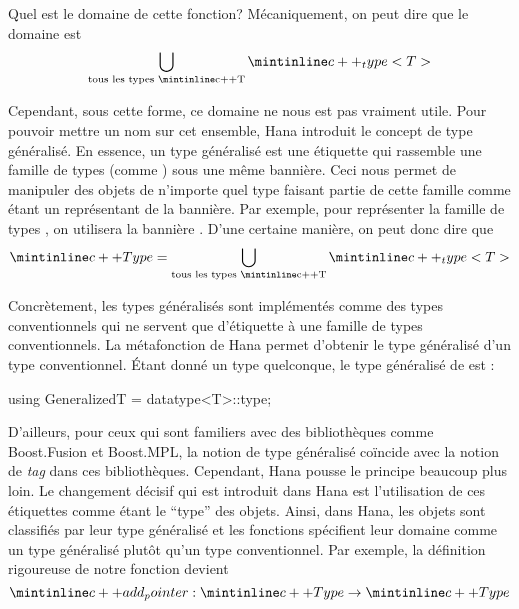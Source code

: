 Quel est le domaine de cette fonction? Mécaniquement, on peut dire que le
domaine est
\[
    \bigcup_{\text{tous les types \cc{T}}} \cc{_type<T>}
\]

Cependant, sous cette forme, ce domaine ne nous est pas vraiment utile. Pour
pouvoir mettre un nom sur cet ensemble, Hana introduit le concept de type
généralisé. En essence, un type généralisé est une étiquette qui rassemble
une famille de types (comme ) sous une même bannière. Ceci
nous permet de manipuler des objets de n'importe quel type faisant partie
de cette famille comme étant un représentant de la bannière. Par exemple,
pour représenter la famille de types , on utilisera la
bannière . D'une certaine manière, on peut donc dire que
\[
    \cc{Type} = \bigcup_{\text{tous les types \cc{T}}} \cc{_type<T>}
\]

Concrètement, les types généralisés sont implémentés comme des types
conventionnels qui ne servent que d'étiquette à une famille de types
conventionnels. La métafonction  de Hana permet d'obtenir
le type généralisé d'un type conventionnel. Étant donné un type 
quelconque, le type généralisé de  est :
\begin{cpp}
    using GeneralizedT = datatype<T>::type;
\end{cpp}

D'ailleurs, pour ceux qui sont familiers avec des bibliothèques comme
Boost.Fusion et Boost.MPL, la notion de type généralisé coïncide avec
la notion de \textit{tag} dans ces bibliothèques. Cependant, Hana pousse
le principe beaucoup plus loin. Le changement décisif qui est introduit dans
Hana est l'utilisation de ces étiquettes comme étant le ``type'' des objets.
Ainsi, dans Hana, les objets sont classifiés par leur type généralisé et les
fonctions spécifient leur domaine comme un type généralisé plutôt qu'un
type conventionnel. Par exemple, la définition rigoureuse de notre fonction
 devient
\[
    \cc{add_pointer} : \cc{Type} \to \cc{Type}
\]

